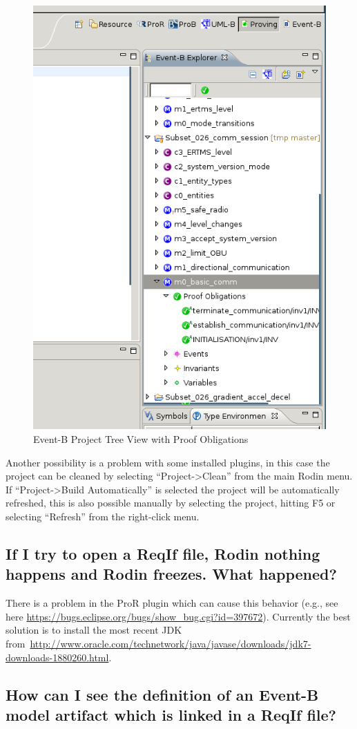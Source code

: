 \documentclass{template/openetcs_article}
\begin{document}
\begin{figure}[H]
  \centering
  \includegraphics[width=.5\textwidth]{RodinEventBView}
  \caption{Event-B Project Tree View with Proof Obligations}
  \label{fig:tree-proof-obligations}
\end{figure}

Another possibility is a problem with some installed plugins, in this case the
project can be cleaned by selecting ``Project->Clean'' from the main Rodin
menu. If  ``Project->Build Automatically'' is selected the project will be
automatically refreshed, this is also possible manually by selecting the
project, hitting F5 or selecting ``Refresh'' from the right-click menu.

\subsection{If I try to open a ReqIf file, Rodin nothing happens and Rodin
  freezes. What happened?}
\label{sec:if-i-try}

There is a problem in the ProR plugin which can cause this behavior (e.g., see
here \url{https://bugs.eclipse.org/bugs/show_bug.cgi?id=397672}). Currently
the best solution is to install the most recent JDK
from~\url{http://www.oracle.com/technetwork/java/javase/downloads/jdk7-downloads-1880260.html}.

\subsection{How can I see the definition of an Event-B model artifact which is
  linked in a ReqIf file?}
\label{sec:how-can-i}
\end{document}
